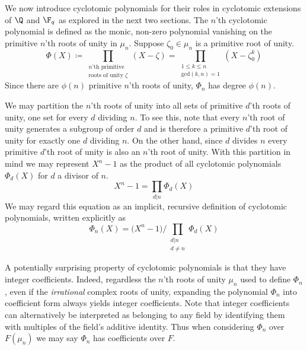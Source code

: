 We now introduce cyclotomic polynomials for their roles in cyclotomic extensions of $\Q$ and $\F_q$ as explored in the next two sections.
The $n$'th cyclotomic polynomial is defined as the monic, non-zero polynomial vanishing on the primitive $n$'th roots of unity in $\mu_n$.
Suppose $\zeta_0\in\mu_n$ is a primitive root of unity.
\begin{equation}
    \Phi(X)\coloneqq\prod_{\substack{
        \text{$n$'th primitive}\\
        \text{roots of unity $\zeta$}
    }} (X - \zeta)
    = \prod_{\substack{1\leq k\leq n\\\text{gcd}(k,n)=1}} (X-\zeta_0^k)
\end{equation}
Since there are $\phi(n)$ primitive $n$'th roots of unity, $\Phi_n$ has degree $\phi(n)$.

We may partition the $n$'th roots of unity into all sets of primitive $d$'th roots of unity, one set for every $d$ dividing $n$.
To see this, note that every $n$'th root of unity generates a subgroup of order $d$ and is therefore a primitive $d$'th root of unity for exactly one $d$ dividing $n$.
On the other hand, since $d$ divides $n$ every primitive $d$'th root of unity is also an $n$'th root of unity.
With this partition in mind we may represent $X^n-1$ as the product of all cyclotomic polynomials $\Phi_d(X)$ for $d$ a divisor of $n$.
\begin{equation}
    X^n - 1 = \prod_{d|n} \Phi_d(X)
\end{equation}
We may regard this equation as an implicit, recursive definition of cyclotomic polynomials, written explicitly as
\begin{equation}
    \Phi_n(X) = \big(X^n - 1\big) \Bigg/ \prod_{\substack{d|n\\d\neq n}} \Phi_d(X)
\end{equation}

A potentially surprising property of cyclotomic polynomials is that they have integer coefficients.
Indeed, regardless the $n$'th roots of unity $\mu_n$ used to define $\Phi_n$, even if the \emph{irrational} complex roots of unity, expanding the polynomial $\Phi_n$ into coefficient form always yields integer coefficients.
Note that integer coefficients can alternatively be interpreted as belonging to any field by identifying them with multiples of the field's additive identity.
Thus when considering $\Phi_n$ over $F(\mu_n)$ we may say $\Phi_n$ has coefficients over $F$.

